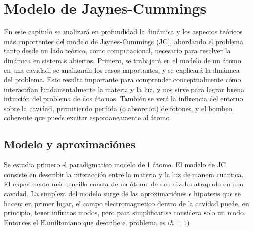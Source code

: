 \chapter{Modelo de Jaynes-Cummings}
\label{ch3_jcm}

\pagestyle{fancy}
\fancyhf{}
\fancyhead[LE]{\nouppercase{\rightmark\hfill}}
\fancyhead[RO]{\nouppercase{\leftmark\hfill}}
\fancyfoot[LE,RO]{\hfill\thepage\hfill}

En este capitulo se analizará en profundidad la din\'amica y los aspectos teóricos más importantes 
del modelo de Jaynes-Cummings (JC), abordando el problema tanto desde un lado te\'orico, como computacional, necesario para resolver la din\'amica en sistemas abiertos.
Primero, se trabajar\'a en el modelo de un átomo en una cavidad, se analizar\'an los casos importantes,
y se explicará la din\'amica del problema. Esto resulta importante para comprender conceptualmente cómo
interact\'uan fundamentalmente la materia y la luz, y nos sirve para lograr buena intuici\'on del
problema de dos átomos. También se ver\'a la influencia del entorno sobre la cavidad, permitiendo
perdida (o absorci\'on) de fotones, y el bombeo coherente que puede excitar espontaneamente
al átomo. \newline

\section{Modelo y aproximaciónes}
Se estudia primero el paradigmatico modelo de 1 átomo. El modelo de JC consiste en describir la interacción entre la materia y la luz de manera cuantica. El experimento más sencillo consta de un átomo de dos niveles atrapado en una cavidad. La simpleza del modelo surge de las aproximaciónes e hipotesis que se hacen; en primer lugar, el campo electromagnetico dentro de la cavidad puede, en principio, tener infinitos modos, pero para simplificar se considera solo un modo. 
Entonces el Hamiltoniano que describe el problema es ($\hbar = 1$)

